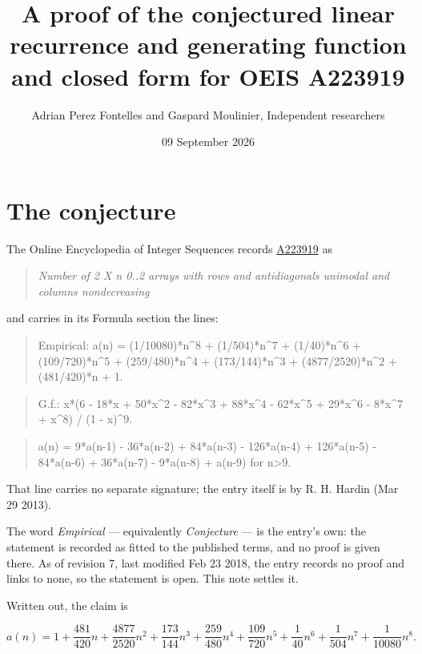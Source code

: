 \documentclass[11pt]{article}
\title{A proof of the conjectured linear recurrence and generating function and closed form for OEIS A223919}
\author{Adrian Perez Fontelles and Gaspard Moulinier, Independent researchers}
\date{09 September 2026}
\theoremstyle{definition}
\begin{document}
\maketitle
\section{The conjecture}

The Online Encyclopedia of Integer Sequences records \href{https://oeis.org/A223919}{A223919} as

\begin{quote}\itshape Number of 2 X n 0..2 arrays with rows and antidiagonals unimodal and columns nondecreasing\end{quote}

and carries in its Formula section the lines:

\begin{quote}\ttfamily Empirical: a(n) = (1/10080)*n\textasciicircum{}8 + (1/504)*n\textasciicircum{}7 + (1/40)*n\textasciicircum{}6 + (109/720)*n\textasciicircum{}5 + (259/480)*n\textasciicircum{}4 + (173/144)*n\textasciicircum{}3 + (4877/2520)*n\textasciicircum{}2 + (481/420)*n + 1.\end{quote}

\begin{quote}\ttfamily G.f.: x*(6 - 18*x + 50*x\textasciicircum{}2 - 82*x\textasciicircum{}3 + 88*x\textasciicircum{}4 - 62*x\textasciicircum{}5 + 29*x\textasciicircum{}6 - 8*x\textasciicircum{}7 + x\textasciicircum{}8) / (1 - x)\textasciicircum{}9.\end{quote}

\begin{quote}\ttfamily a(n) = 9*a(n-1) - 36*a(n-2) + 84*a(n-3) - 126*a(n-4) + 126*a(n-5) - 84*a(n-6) + 36*a(n-7) - 9*a(n-8) + a(n-9) for n>9.\end{quote}

That line carries no separate signature; the entry itself is by R. H. Hardin (Mar 29 2013).

The word {\itshape Empirical} --- equivalently {\itshape Conjecture} --- is the entry's own: the statement is recorded as fitted to the published terms, and no proof is given there. As of revision 7, last modified Feb 23 2018, the entry records no proof and links to none, so the statement is open. This note settles it.

Written out, the claim is

\[a(n) = 1 + \frac{481}{420}n + \frac{4877}{2520}n^{2} + \frac{173}{144}n^{3} + \frac{259}{480}n^{4} + \frac{109}{720}n^{5} + \frac{1}{40}n^{6} + \frac{1}{504}n^{7} + \frac{1}{10080}n^{8}.\]
\end{document}
